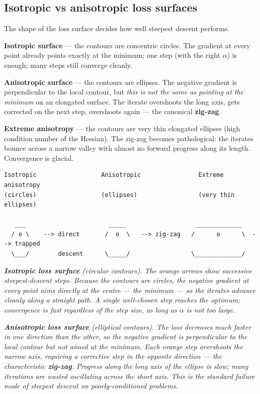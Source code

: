 \documentclass[11pt, a4paper]{article}
\begin{document}
\subsection{Isotropic vs anisotropic loss surfaces}

The shape of the loss surface decides how well steepest descent performs.

\textbf{Isotropic surface} — the contours are concentric circles. The gradient at every point already points exactly at the minimum; one step (with the right $\alpha$) is enough; many steps still converge cleanly.

\textbf{Anisotropic surface} — the contours are ellipses. The negative gradient is perpendicular to the local contour, but \emph{this is not the same as pointing at the minimum} on an elongated surface. The iterate overshoots the long axis, gets corrected on the next step, overshoots again — the canonical \textbf{zig-zag}.

\textbf{Extreme anisotropy} — the contours are very thin elongated ellipses (high condition number of the Hessian). The zig-zag becomes pathological: the iterates bounce across a narrow valley with almost no forward progress along its length. Convergence is glacial.

\begin{verbatim}
Isotropic                  Anisotropic                Extreme anisotropy
(circles)                  (ellipses)                 (very thin ellipses)

   ___                       _____                   _____________
  / o \    --> direct       /  o  \   --> zig-zag   /      o      \  --> trapped
  \___/        descent      \_____/                 \_____________/
\end{verbatim}

\begin{center}

\footnotesize\textit{\textbf{Isotropic loss surface} (circular contours). The orange arrows show successive steepest-descent steps. Because the contours are circles, the negative gradient at every point aims directly at the centre --- the minimum --- so the iterates advance cleanly along a straight path. A single well-chosen step reaches the optimum; convergence is fast regardless of the step size, as long as $\alpha$ is not too large.}
\end{center}

\begin{center}

\footnotesize\textit{\textbf{Anisotropic loss surface} (elliptical contours). The loss decreases much faster in one direction than the other, so the negative gradient is perpendicular to the local contour but \emph{not} aimed at the minimum. Each orange step overshoots the narrow axis, requiring a corrective step in the opposite direction --- the characteristic \textbf{zig-zag}. Progress along the long axis of the ellipse is slow; many iterations are wasted oscillating across the short axis. This is the standard failure mode of steepest descent on poorly-conditioned problems.}
\end{center}
\end{document}
